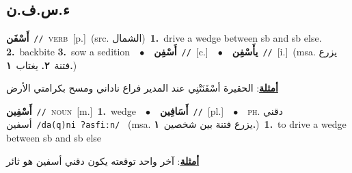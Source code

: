 \documentclass[10pt,a4paper,twoside]{article} %
\begin{document}
\begin{multicols}{2}
\vspace{-3mm}
\subsection*{\color{blue}\foreignlanguage{arabic}{ء.س.ف.ن}\color{blue}{ (ntws)}} 

{\setlength\topsep{0pt}\textbf{\foreignlanguage{arabic}{أَسْفَن}}\ {\color{gray}\texttt{//}\color{black}}\ \textsc{verb}\ [p.]\ (src. \color{gray}\foreignlanguage{arabic}{الشمال}\color{black})\ \textbf{1.}~drive a wedge between sb and sb else.  \textbf{2.}~backbite  \textbf{3.}~sow a sedition\ \ $\bullet$\ \ \setlength\topsep{0pt}\textbf{\foreignlanguage{arabic}{أَسْفِن}}\ {\color{gray}\texttt{//}\color{black}}\ [c.]\ \ $\bullet$\ \ \setlength\topsep{0pt}\textbf{\foreignlanguage{arabic}{يأَسْفِن}}\ {\color{gray}\texttt{//}\color{black}}\ [i.]\ \color{gray}(msa. \foreignlanguage{arabic}{يزرع فتنة}~\foreignlanguage{arabic}{\textbf{٢.}}  \foreignlanguage{arabic}{يغتاب}~\foreignlanguage{arabic}{\textbf{١.}})\color{black}\  \begin{flushright}\color{gray}\foreignlanguage{arabic}{\textbf{\underline{\foreignlanguage{arabic}{أمثلة}}}: الحقيرة أسْفَنَتْنِي عند المدير فراع ناداني ومسح بكرامتي الأرض}\end{flushright}\color{black}} \vspace{2mm}

{\setlength\topsep{0pt}\textbf{\foreignlanguage{arabic}{أَسْفِين}}\ {\color{gray}\texttt{//}\color{black}}\ \textsc{noun}\ [m.]\ \textbf{1.}~wedge\ \ $\bullet$\ \ \setlength\topsep{0pt}\textbf{\foreignlanguage{arabic}{أَسَافِين}}\ {\color{gray}\texttt{//}\color{black}}\ [pl.]\ \ $\bullet$\ \ \textsc{ph.} \color{gray} \foreignlanguage{arabic}{دقني أسفين}\color{black}\ {\color{gray}\texttt{/{\sffamily da(q)ni ʔasfiːn}/}\color{black}}\ \color{gray} (msa. \foreignlanguage{arabic}{يزرع فتنة بين شخصين}~\foreignlanguage{arabic}{\textbf{١.}})\color{black}\ \textbf{1.}~to drive a wedge between sb and sb else\  \begin{flushright}\color{gray}\foreignlanguage{arabic}{\textbf{\underline{\foreignlanguage{arabic}{أمثلة}}}: آخر واحد توقعته يكون دقني أسفين هو ثائر}\end{flushright}\color{black}} \vspace{2mm}


\end{multicols}
\end{document}
